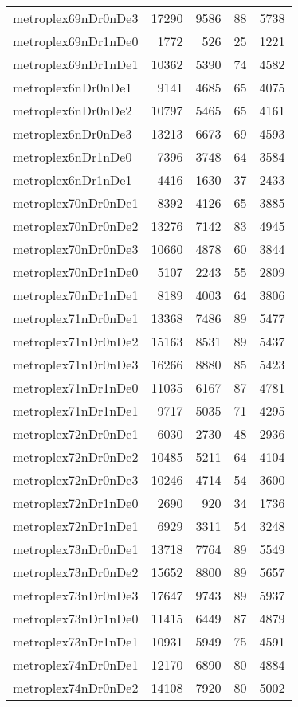 \documentclass[../../../thesis.tex]{subfiles}
\begin{document}
\begin{longtable}{lrrrr}
metroplex69nDr0nDe3 & 17290 & 9586 & 88 & 5738 \\
metroplex69nDr1nDe0 & 1772 & 526 & 25 & 1221 \\
metroplex69nDr1nDe1 & 10362 & 5390 & 74 & 4582 \\
metroplex6nDr0nDe1 & 9141 & 4685 & 65 & 4075 \\
metroplex6nDr0nDe2 & 10797 & 5465 & 65 & 4161 \\
metroplex6nDr0nDe3 & 13213 & 6673 & 69 & 4593 \\
metroplex6nDr1nDe0 & 7396 & 3748 & 64 & 3584 \\
metroplex6nDr1nDe1 & 4416 & 1630 & 37 & 2433 \\
metroplex70nDr0nDe1 & 8392 & 4126 & 65 & 3885 \\
metroplex70nDr0nDe2 & 13276 & 7142 & 83 & 4945 \\
metroplex70nDr0nDe3 & 10660 & 4878 & 60 & 3844 \\
metroplex70nDr1nDe0 & 5107 & 2243 & 55 & 2809 \\
metroplex70nDr1nDe1 & 8189 & 4003 & 64 & 3806 \\
metroplex71nDr0nDe1 & 13368 & 7486 & 89 & 5477 \\
metroplex71nDr0nDe2 & 15163 & 8531 & 89 & 5437 \\
metroplex71nDr0nDe3 & 16266 & 8880 & 85 & 5423 \\
metroplex71nDr1nDe0 & 11035 & 6167 & 87 & 4781 \\
metroplex71nDr1nDe1 & 9717 & 5035 & 71 & 4295 \\
metroplex72nDr0nDe1 & 6030 & 2730 & 48 & 2936 \\
metroplex72nDr0nDe2 & 10485 & 5211 & 64 & 4104 \\
metroplex72nDr0nDe3 & 10246 & 4714 & 54 & 3600 \\
metroplex72nDr1nDe0 & 2690 & 920 & 34 & 1736 \\
metroplex72nDr1nDe1 & 6929 & 3311 & 54 & 3248 \\
metroplex73nDr0nDe1 & 13718 & 7764 & 89 & 5549 \\
metroplex73nDr0nDe2 & 15652 & 8800 & 89 & 5657 \\
metroplex73nDr0nDe3 & 17647 & 9743 & 89 & 5937 \\
metroplex73nDr1nDe0 & 11415 & 6449 & 87 & 4879 \\
metroplex73nDr1nDe1 & 10931 & 5949 & 75 & 4591 \\
metroplex74nDr0nDe1 & 12170 & 6890 & 80 & 4884 \\
metroplex74nDr0nDe2 & 14108 & 7920 & 80 & 5002 \\

\end{longtable}
\end{document}
